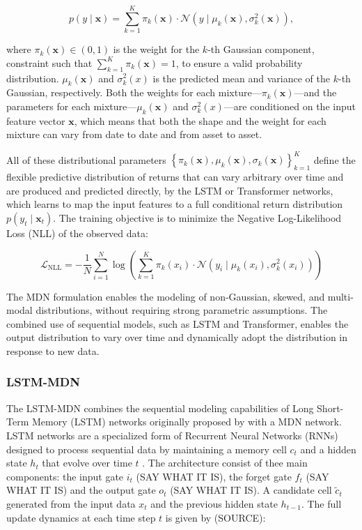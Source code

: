 \begin{equation}
    p(y \mid \textbf{x}) = \sum_{k=1}^{K} \pi_k(\textbf{x}) \cdot \mathcal{N}(y \mid \mu_k(\textbf{x}), \sigma_k^2(\textbf{x})),
\end{equation}

where $\pi_k(\textbf{x}) \in (0, 1)$ is the weight for the $k$-th Gaussian component, constraint such that $\sum_{k=1}^{K} \pi_k(\textbf{x}) = 1$, to ensure a valid probability distribution. $\mu_k(\textbf{x})$ and $\sigma_k^2(x)$ is the predicted mean and variance of the $k$-th Gaussian, respectively. Both the weights for each mixture—$\pi_k(\textbf{x})$—and the parameters for each mixture—$\mu_k(\textbf{x})$ and $\sigma_k^2(x)$—are conditioned on the input feature vector $\textbf{x}$, which means that both the shape and the weight for each mixture can vary from date to date and from asset to asset.

All of these distributional parameters $\left\{ \pi_k(\textbf{x}), \mu_k(\textbf{x}), \sigma_k(\textbf{x}) \right\}_{k=1}^{K}$ define the flexible predictive distribution of returns that can vary arbitrary over time and are produced and predicted directly, by the LSTM or Transformer networks, which learns to map the input features to a full conditional return distribution $p(y_t \mid \textbf{x}_t)$. The training objective is to minimize the Negative Log-Likelihood Loss (NLL) of the observed data:

\begin{equation}
    \mathcal{L}_{\text{NLL}} = -\frac{1}{N} \sum_{i=1}^{N} \log\left( \sum_{k=1}^{K} \pi_k(x_i) \cdot \mathcal{N}(y_i \mid \mu_k(x_i), \sigma_k^2(x_i)) \right)
\end{equation}

The MDN formulation enables the modeling of non-Gaussian, skewed, and multi-modal distributions, without requiring strong parametric assumptions. The combined use of sequential models, such as LSTM and Transformer, enables the output distribution to vary over time and dynamically adopt the distribution in response to new data. 

\subsubsection{LSTM-MDN} 
The LSTM-MDN combines the sequential modeling capabilities of Long Short-Term Memory (LSTM) networks originally proposed by \textcite{hochreiter1997lstm} with a MDN network. LSTM networks are a specialized form of Recurrent Neural Networks (RNNs) designed to process sequential data by maintaining a memory cell $c_t$ and a hidden state $h_t$ that evolve over time $t$ \parencite{hochreiter1997lstm}. The architecture consist of thee main components: the input gate $i_t$ (SAY WHAT IT IS), the forget gate $f_t$ (SAY WHAT IT IS) and the output gate $o_t$ (SAY WHAT IT IS).  A candidate cell $\tilde{c}_t$ generated from the input data $x_t$ and the previous hidden state $h_{t-1}$. The full update dynamics at each time step $t$ is given by (SOURCE):  

